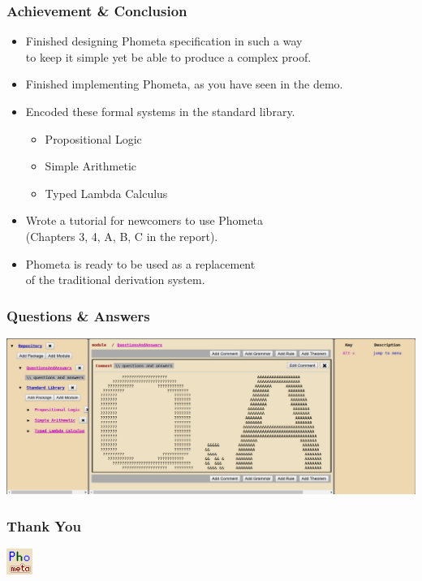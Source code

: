 \documentclass[notes]{beamer}
\begin{document}
\begin{frame}
\frametitle{Achievement  \& Conclusion}

\begin{itemize}
\item Finished designing Phometa specification in such a way \\to keep it simple
  yet be able to produce a complex proof.\\ [1em]
\item Finished implementing Phometa, as you have seen in the demo.\\ [1em]
\item Encoded these formal systems in the standard library.
  \begin{itemize}
  \item Propositional Logic
  \item Simple Arithmetic
  \item Typed Lambda Calculus\\ [1em]
  \end{itemize}
\item Wrote a tutorial for newcomers to use Phometa\\(Chapters 3, 4, A, B, C in
  the report). \\[1em]
\item Phometa is ready to be used as a replacement\\of the traditional derivation system.
\end{itemize}
\end{frame}

\begin{frame}
\frametitle{Questions \& Answers}

\includegraphics[width=\linewidth,height=\textheight,keepaspectratio]{demo-questions-and-answers}

\end{frame}


\begin{frame}
\frametitle{Thank You}

\begin{center}
\includegraphics[width=0.5\linewidth,height=\textheight,keepaspectratio]{../logo}
\end{center}

\end{frame}
\end{document}
